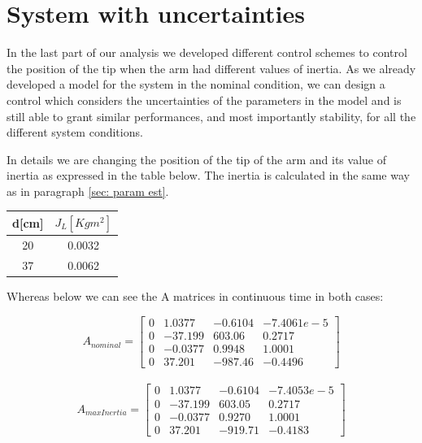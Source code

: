 \chapter{System with uncertainties}
\label{cha:position_tip_uncertanties}

In the last part of our analysis we developed different control schemes to control the position of the tip when the arm had different values of inertia. As we already developed a model for the system in the nominal condition, we can design a control which considers the uncertainties of the parameters in the model and is still able to grant similar performances, and most importantly stability, for all the different system conditions.

In details we are changing the position of the tip of the arm and its value of inertia as expressed in the table below. The inertia is calculated in the same way as in paragraph \ref{sec: param est}.

\begin{table}[h!]
    \centering
    \begin{tabular}{||c c||} 
    \hline
    d[cm] & $J_L[Kgm^2]$ \\ 
    \hline\hline
    20 &  0.0032  \\ 
    \hline
    37 & 0.0062 \\
    \hline
    \end{tabular}
\end{table}

Whereas below we can see the A matrices in continuous time in both cases:

\[
A_{nominal} =
\begin{bmatrix}
    0  &  1.0377    &   -0.6104 &   -7.4061e-5       \\
    0  &  -37.199    &   603.06 &   0.2717       \\
    0  &  -0.0377    &   0.9948 &   1.0001       \\
    0  &  37.201    &   -987.46 &   -0.4496      
\end{bmatrix}   \]
\\
\[
A_{maxInertia} = 
\begin{bmatrix}
    0  &  1.0377    &   -0.6104 &   -7.4053e-5       \\
    0  &  -37.199    &   603.05 &   0.2717       \\
    0  &  -0.0377    &   0.9270 &   1.0001       \\
    0  &  37.201    &   -919.71 &   -0.4183        
\end{bmatrix} 
\]

